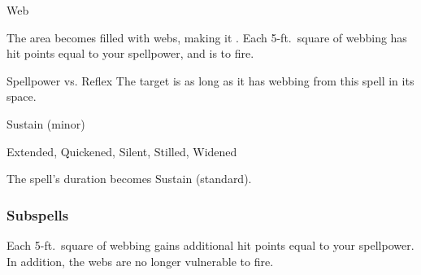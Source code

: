 \begin{spellsection}{Web}
\begin{spellheader}
\end{spellheader}
\begin{spellcontent}
\begin{spelltargetinginfo}
\end{spelltargetinginfo}
\begin{spelleffects}
\spelleffect
The area becomes filled with webs, making it .
Each 5-ft.\ square of webbing has hit points equal to your spellpower, and is  to fire.
\begin{spellattack}{Spellpower vs. Reflex}
\spellsuccess The target is \immobilized as long as it has webbing from this spell in its space.
\end{spellattack}
\spelldur Sustain (minor)
\end{spelleffects}
\end{spellcontent}
\begin{spellfooter}
 Extended, Quickened, Silent, Stilled, Widened
\end{spellfooter}
\begin{spellsubcontent}
\begin{spellcantrip}
The spell's duration becomes Sustain (standard).
\end{spellcantrip}
\end{spellsubcontent}
\end{spellsection}
\subsubsection{Subspells}
Each 5-ft.\ square of webbing gains additional hit points equal to your spellpower.
In addition, the webs are no longer vulnerable to fire.